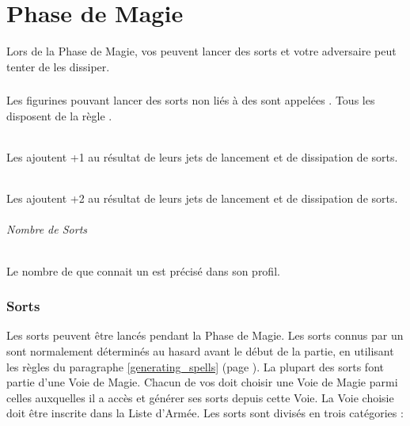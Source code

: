 
\hypertarget{magicphase}{\part{Phase de Magie}}

Lors de la Phase de Magie, vos \wizards{} peuvent lancer des sorts et votre adversaire peut tenter de les dissiper.

\section{\wizards}

Les figurines pouvant lancer des sorts non liés à des \boundspells{} sont appelées \wizards{}. Tous les \wizards{} disposent de la règle \channel{}.

\paragraph{\wizardapprentices} 

Les \wizardapprentices{} ajoutent +1 au résultat de leurs jets de lancement et de dissipation de sorts.

\paragraph{\wizardmasters} 

Les \wizardmasters{} ajoutent +2 au résultat de leurs jets de lancement et de dissipation de sorts.

\paragraph{Nombre de Sorts}

Le nombre de \learnedspells{} que connait un \wizard{} est précisé dans son profil.

\section{Sorts}

Les sorts peuvent être lancés pendant la Phase de Magie. Les sorts connus par un \wizard{} sont normalement déterminés au hasard avant le début de la partie, en utilisant les règles du paragraphe \ref{generating_spells} (page \pageref{generating_spells}). La plupart des sorts font partie d'une Voie de Magie. Chacun de vos \wizards{} doit choisir une Voie de Magie parmi celles auxquelles il a accès et générer ses sorts depuis cette Voie. La Voie choisie doit être inscrite dans la Liste d'Armée. Les sorts sont divisés en trois catégories :

